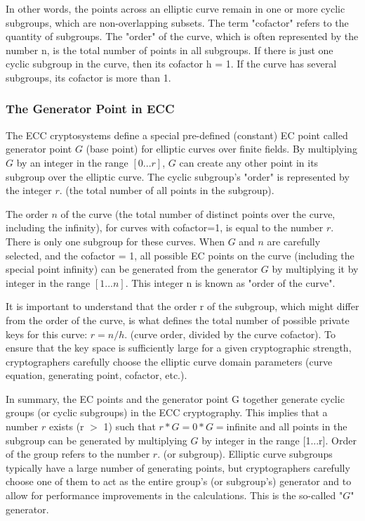 \documentclass{article}
\begin{document}
In other words, the points across an elliptic curve remain in one or more cyclic subgroups, which are non-overlapping subsets. The term "cofactor" refers to the quantity of subgroups. The "order" of the curve, which is often represented by the number n, is the total number of points in all subgroups. If there is just one cyclic subgroup in the curve, then its cofactor h = 1. If the curve has several subgroups, its cofactor is more than 1.
\subsubsection{The Generator Point in ECC}
The ECC cryptosystems define a special pre-defined (constant) EC point called generator point $G$ (base point) for elliptic curves over finite fields. By multiplying $G$ by an integer in the range $[0...r]$, $G$ can create any other point in its subgroup over the elliptic curve. The cyclic subgroup's "order" is represented by the integer $r$. (the total number of all points in the subgroup).

The order $n$ of the curve (the total number of distinct points over the curve, including the infinity), for curves with cofactor=1, is equal to the number $r$. There is only one subgroup for these curves.
When $G$ and $n$ are carefully selected, and the cofactor = 1, all possible EC points on the curve (including the special point infinity) can be generated from the generator $G$ by multiplying it by integer in the range $[1...n]$. This integer n is known as "order of the curve".

It is important to understand that the order r of the subgroup, which might differ from the order of the curve, is what defines the total number of possible private keys for this curve: $r = n / h$. (curve order, divided by the curve cofactor). To ensure that the key space is sufficiently large for a given cryptographic strength, cryptographers carefully choose the elliptic curve domain parameters (curve equation, generating point, cofactor, etc.).

In summary, the EC points and the generator point G together generate cyclic groups (or cyclic subgroups) in the ECC cryptography. This implies that a number $r$ exists (r $>$ 1) such that $r * G = 0 * G = $infinite and all points in the subgroup can be generated by multiplying $G$ by integer in the range [1...r]. Order of the group refers to the number $r$. (or subgroup).
Elliptic curve subgroups typically have a large number of generating points, but cryptographers carefully choose one of them to act as the entire group's (or subgroup's) generator and to allow for performance improvements in the calculations. This is the so-called "$G$" generator.
\end{document}
